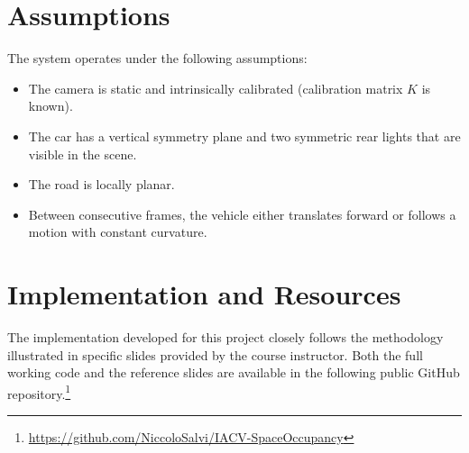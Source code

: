 \section{Assumptions}
The system operates under the following assumptions:
\begin{itemize}
    \item The camera is static and intrinsically calibrated (calibration matrix $K$ is known).
    \item The car has a vertical symmetry plane and two symmetric rear lights that are visible in the scene.
    \item The road is locally planar.
    \item Between consecutive frames, the vehicle either translates forward or follows a motion with constant curvature.
\end{itemize}

\section*{Implementation and Resources}
The implementation developed for this project closely follows the methodology illustrated in specific slides provided by the course instructor. Both the full working code and the reference slides are available in the following public GitHub repository.\footnote{\url{https://github.com/NiccoloSalvi/IACV-SpaceOccupancy}}